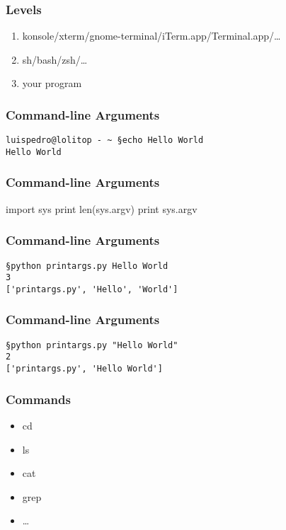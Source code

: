 \begin{frame}[fragile]
\frametitle{Levels}
\begin{enumerate}
\item konsole/xterm/gnome-terminal/iTerm.app/Terminal.app/\ldots
\item sh/bash/zsh/\ldots
\item your program
\end{enumerate}
\end{frame}

\begin{frame}[fragile]
\frametitle{Command-line Arguments}

\begin{verbatim}
luispedro@lolitop - ~ §echo Hello World
Hello World
\end{verbatim}
\end{frame}

\begin{frame}[fragile]
\frametitle{Command-line Arguments}

\begin{python}
import sys
print len(sys.argv)
print sys.argv
\end{python}
\end{frame}

\begin{frame}[fragile]
\frametitle{Command-line Arguments}

\begin{verbatim}
§python printargs.py Hello World
3
['printargs.py', 'Hello', 'World']
\end{verbatim}
\end{frame}

\begin{frame}[fragile]
\frametitle{Command-line Arguments}

\begin{verbatim}
§python printargs.py "Hello World"
2
['printargs.py', 'Hello World']
\end{verbatim}
\end{frame}

\begin{frame}[fragile]
\frametitle{Commands}

\begin{itemize}
\item cd
\item ls
\item cat
\item grep
\item \ldots
\end{itemize}
\end{frame}

